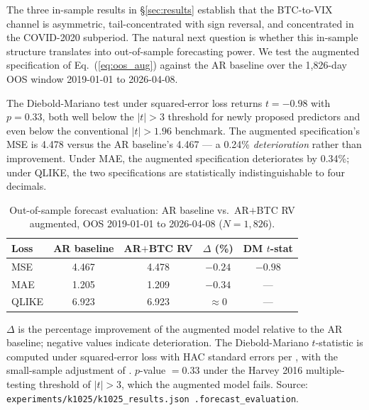\documentclass[11pt,a4paper]{article}
\begin{document}
The three in-sample results in \S\ref{sec:results} establish that the BTC-to-VIX channel is asymmetric, tail-concentrated with sign reversal, and concentrated in the COVID-2020 subperiod. The natural next question is whether this in-sample structure translates into out-of-sample forecasting power. We test the augmented specification of Eq.~(\ref{eq:oos_aug}) against the AR baseline over the 1{,}826-day OOS window 2019-01-01 to 2026-04-08.

The Diebold-Mariano test under squared-error loss returns $t = -0.98$ with $p = 0.33$, both well below the \citet{harvey2016} $|t| > 3$ threshold for newly proposed predictors and even below the conventional $|t| > 1.96$ benchmark.%
 The augmented specification's MSE is 4.478 versus the AR baseline's 4.467 --- a 0.24\% \emph{deterioration} rather than improvement. Under MAE, the augmented specification deteriorates by 0.34\%; under QLIKE, the two specifications are statistically indistinguishable to four decimals.

\begin{table}[H]
\centering
\caption{Out-of-sample forecast evaluation: AR baseline vs.\ AR$+$BTC RV augmented, OOS 2019-01-01 to 2026-04-08 ($N = 1{,}826$).}
\label{tab:oos}
\begin{tabular}{lcccc}
\toprule
Loss & AR baseline & AR$+$BTC RV & $\Delta$ (\%) & DM $t$-stat \\
\midrule
MSE   & 4.467 & 4.478 & $-0.24$ & $-0.98$ \\
MAE   & 1.205 & 1.209 & $-0.34$ & --- \\
QLIKE & 6.923 & 6.923 & $\approx 0$ & --- \\
\bottomrule
\end{tabular}
\begin{flushleft}
\footnotesize $\Delta$ is the percentage improvement of the augmented model relative to the AR baseline; negative values indicate deterioration. The Diebold-Mariano $t$-statistic is computed under squared-error loss with HAC standard errors per \citet{diebold1995}, with the small-sample adjustment of \citet{harvey1997}. $p$-value $= 0.33$ under the Harvey 2016 multiple-testing threshold of $|t| > 3$, which the augmented model fails. Source: \texttt{experiments/k1025/k1025\_results.json .forecast\_evaluation}.
\end{flushleft}
\end{table}
\end{document}
